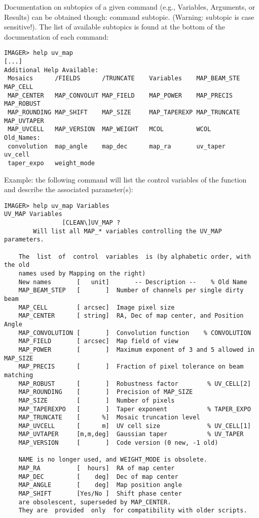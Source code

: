 Documentation on subtopics of a given command (e.g., Variables, Arguments, or Results) 
can be obtained though:  command subtopic. (Warning: subtopic is case sensitive!). 
The list of available subtopics is found at the bottom of the documentation of each command: 
\begin{verbatim} 
IMAGER> help uv_map
[...] 
Additional Help Available:
 Mosaics      /FIELDS      /TRUNCATE    Variables    MAP_BEAM_STE MAP_CELL
 MAP_CENTER   MAP_CONVOLUT MAP_FIELD    MAP_POWER    MAP_PRECIS   MAP_ROBUST
 MAP_ROUNDING MAP_SHIFT    MAP_SIZE     MAP_TAPEREXP MAP_TRUNCATE MAP_UVTAPER
 MAP_UVCELL   MAP_VERSION  MAP_WEIGHT   MCOL         WCOL         Old_Names:
 convolution  map_angle    map_dec      map_ra       uv_taper     uv_cell
 taper_expo   weight_mode
\end{verbatim} 

Example: the following command will list the control variables of the 
 function and describe the associated parameter(s): 
\begin{verbatim} 
IMAGER> help uv_map Variables
UV_MAP Variables
                [CLEAN\]UV_MAP ?
        Will list all MAP_* variables controlling the UV_MAP parameters.
 
    The  list  of  control  variables  is (by alphabetic order, with the old
    names used by Mapping on the right)
    New names       [   unit]       -- Description --    % Old Name
    MAP_BEAM_STEP   [       ]  Number of channels per single dirty beam
    MAP_CELL        [ arcsec]  Image pixel size
    MAP_CENTER      [ string]  RA, Dec of map center, and Position Angle
    MAP_CONVOLUTION [       ]  Convolution function    % CONVOLUTION
    MAP_FIELD       [ arcsec]  Map field of view
    MAP_POWER       [       ]  Maximum exponent of 3 and 5 allowed in MAP_SIZE
    MAP_PRECIS      [       ]  Fraction of pixel tolerance on beam matching
    MAP_ROBUST      [       ]  Robustness factor        % UV_CELL[2]
    MAP_ROUNDING    [       ]  Precision of MAP_SIZE
    MAP_SIZE        [       ]  Number of pixels
    MAP_TAPEREXPO   [       ]  Taper exponent           % TAPER_EXPO
    MAP_TRUNCATE    [      %]  Mosaic truncation level
    MAP_UVCELL      [      m]  UV cell size             % UV_CELL[1]
    MAP_UVTAPER     [m,m,deg]  Gaussian taper           % UV_TAPER
    MAP_VERSION     [       ]  Code version (0 new, -1 old)
 
    NAME is no longer used, and WEIGHT_MODE is obsolete.
    MAP_RA          [  hours]  RA of map center
    MAP_DEC         [    deg]  Dec of map center
    MAP_ANGLE       [    deg]  Map position angle
    MAP_SHIFT       [Yes/No ]  Shift phase center
    are obsolescent, superseded by MAP_CENTER. 
    They are  provided  only  for compatibility with older scripts.
\end{verbatim} 

